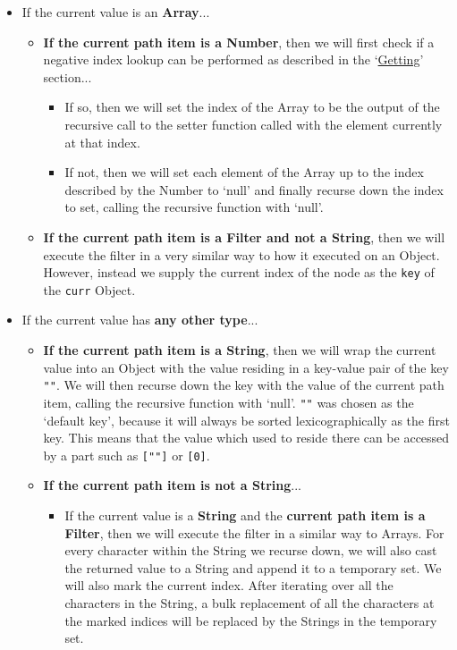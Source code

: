 \begin{center}
\begin{itemize}
\begin{itemize}
            \item If the current value is an \textbf{Array}...
            \begin{itemize}
                \item \textbf{If the current path item is a Number}, then we will first check if a negative index lookup can be performed as described in the `\hyperref[sec:jsonpath-getting]{Getting}' section...
                \begin{itemize}
                    \item If so, then we will set the index of the Array to be the output of the recursive call to the setter function called with the element currently at that index.
                    \item If not, then we will set each element of the Array up to the index described by the Number to `null' and finally recurse down the index to set, calling the recursive function with `null'.
                \end{itemize}
                \item \textbf{If the current path item is a Filter and not a String}, then we will execute the filter in a very similar way to how it executed on an Object. However, instead we supply the current index of the node as the \verb|key| of the \verb|curr| Object.
            \end{itemize}
            \item If the current value has \textbf{any other type}...
            \begin{itemize}
                \item \textbf{If the current path item is a String}, then we will wrap the current value into an Object with the value residing in a key-value pair of the key \verb|""|. We will then recurse down the key with the value of the current path item, calling the recursive function with `null'. \verb|""| was chosen as the `default key', because it will always be sorted lexicographically as the first key. This means that the value which used to reside there can be accessed by a part such as \verb|[""]| or \verb|[0]|.
                \item \textbf{If the current path item is not a String}...
                \begin{itemize}
                    \item If the current value is a \textbf{String} and the \textbf{current path item is a Filter}, then we will execute the filter in a similar way to Arrays. For every character within the String we recurse down, we will also cast the returned value to a String and append it to a temporary set. We will also mark the current index. After iterating over all the characters in the String, a bulk replacement of all the characters at the marked indices will be replaced by the Strings in the temporary set.

\end{itemize}
\end{itemize}
\end{itemize}
\end{itemize}
\end{center}
